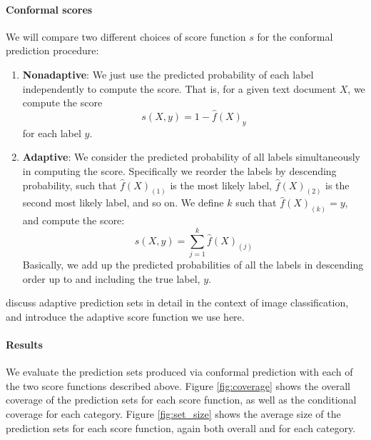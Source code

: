 \documentclass[a4paper, 12pt]{article}
\begin{document}
\paragraph{Conformal scores}
We will compare two different choices of score function $s$ for the conformal prediction procedure:
\begin{enumerate}
    \item \textbf{Nonadaptive}: We just use the predicted probability of each label independently to compute the score. That is, for a given text document $X$, we compute the score \[s(X, y) = 1 - \hat{f}(X)_y \] for each label $y$.
    \item \textbf{Adaptive}: We consider the predicted probability of all labels simultaneously in computing the score. Specifically we reorder the labels by descending probability, such that $\hat{f}(X)_{(1)}$ is the most likely label, $\hat{f}(X)_{(2)}$ is the second most likely label, and so on. We define $k$ such that $\hat{f}(X)_{(k)} = y$, and compute the score: \[ s(X, y) = \sum_{j=1}^{k} \hat{f}(X)_{(j)} \] Basically, we add up the predicted probabilities of all the labels in descending order up to and including the true label, $y$.
\end{enumerate}

\textcite{angelopoulosUncertaintySetsImage2022} discuss adaptive prediction sets in detail in the context of image classification, and introduce the adaptive score function we use here.

\paragraph*{Results} We evaluate the prediction sets produced via conformal prediction with each of the two score functions described above. Figure \ref{fig:coverage} shows the overall coverage of the prediction sets for each score function, as well as the conditional coverage for each category. Figure \ref{fig:set_size} shows the average size of the prediction sets for each score function, again both overall and for each category.
\end{document}
